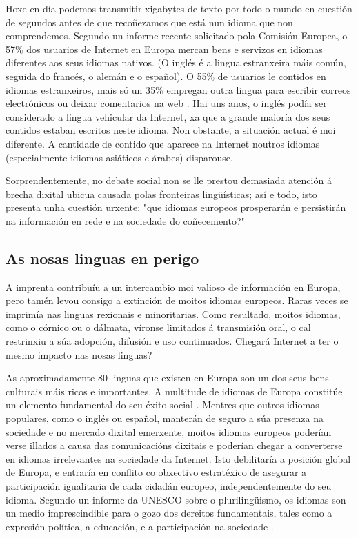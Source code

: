 \begin{multicols}{2}


Hoxe en día podemos transmitir xigabytes de texto por todo o mundo en cuestión de segundos antes de que recoñezamos que está nun idioma que non comprendemos. Segundo un informe recente solicitado pola Comisión Europea, o 57\% dos usuarios de Internet en Europa mercan bens e servizos en idiomas diferentes aos seus idiomas nativos. (O inglés é a lingua estranxeira máis común, seguida do francés, o alemán e o español). O 55\% de usuarios le contidos en idiomas estranxeiros, mais só un 35\% empregan outra lingua para escribir correos electrónicos ou deixar comentarios na web \cite{GAL-Nota1}.  Hai uns anos, o inglés podía ser considerado a lingua vehicular da Internet, xa que a grande maioría dos seus contidos estaban escritos neste idioma. Non obstante, a situación actual é moi diferente. A cantidade de contido que aparece na Internet noutros idiomas (especialmente idiomas asiáticos e árabes) disparouse.

Sorprendentemente, no debate social non se lle prestou demasiada atención á brecha dixital ubicua causada polas fronteiras lingüísticas; así e todo, isto presenta unha cuestión urxente: "que idiomas europeos prosperarán e persistirán na información en rede e na sociedade do coñecemento?"

\subsection{As nosas linguas en perigo}

    A imprenta contribuíu a un intercambio moi valioso de información en Europa, pero tamén levou consigo a extinción de moitos idiomas europeos. Raras veces se imprimía nas linguas rexionais e minoritarias. Como resultado, moitos idiomas, como o córnico ou o dálmata, víronse limitados á transmisión oral, o cal restrinxiu a súa adopción, difusión e uso continuados. Chegará Internet a ter o mesmo impacto nas nosas linguas?


As aproximadamente 80 linguas que existen en Europa son un dos seus bens culturais máis ricos e importantes. A multitude de idiomas de Europa constitúe un elemento fundamental do seu éxito social \cite{GAL-Nota2}. Mentres que outros idiomas populares, como o inglés ou español, manterán de seguro a súa presenza na sociedade e no mercado dixital emerxente, moitos idiomas europeos poderían verse illados a causa das comunicacións dixitais e poderían chegar a converterse en idiomas irrelevantes na sociedade da Internet. Isto debilitaría a posición global de Europa, e entraría en conflito co obxectivo estratéxico de asegurar a participación igualitaria de cada cidadán europeo, independentemente do seu idioma. Segundo un informe da UNESCO sobre o plurilingüismo, os idiomas son un medio imprescindible para o gozo dos dereitos fundamentais, tales como a expresión política, a educación, e a participación na sociedade \cite{GAL-Nota3}.


\end{multicols}
